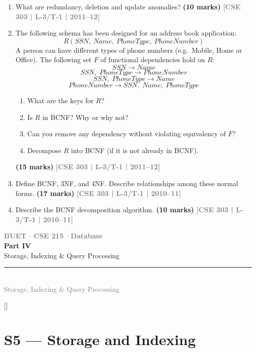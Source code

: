 \documentclass[12pt]{article}
\newcommand{\yr}[1]{\hfill\textcolor{gray}{\small\textbf{[#1]}}}
\newcommand{\mk}[1]{\textcolor{orange!70!black}{\small\textbf{(#1 marks)}}}
\newcommand{\secdivider}[4]{%
  \newpage\thispagestyle{empty}%
  \vspace*{\fill}%
  \begin{tcolorbox}[enhanced,colback=#4!7,colframe=#3,boxrule=1.5pt,arc=8pt,
    left=20pt,right=20pt,top=22pt,bottom=22pt,
    shadow={3pt}{-3pt}{0pt}{black!15}]
    \centering
    {\large\textcolor{gray}{\textbf{BUET $\cdot$ CSE 215 $\cdot$ Database}}}\\[8pt]
    {\fontsize{26}{32}\selectfont\bfseries\textcolor{#3}{#1}}\\[6pt]
    {\fontsize{15}{19}\selectfont\textcolor{dgray}{#2}}\\[12pt]
    \textcolor{#3!60}{\rule{0.5\textwidth}{0.5pt}}\\[6pt]
    {\small\textcolor{gray}{#2}}
  \end{tcolorbox}%
  \vspace*{\fill}\newpage%
}
\begin{document}
\begin{enumerate}
\item What are redundancy, deletion and update anomalies?
\mk{10} \yr{CSE 303 | L-3/T-1 | 2011--12}


\item The following schema has been designed for an address book application:
\[R(SSN,\ Name,\ PhoneType,\ PhoneNumber)\]
A person can have different types of phone numbers (e.g.\ Mobile, Home or Office). The following set $F$ of functional dependencies hold on $R$:
\[SSN \to Name\]
\[SSN,\;PhoneType \to PhoneNumber\]
\[SSN,\;PhoneType \to Name\]
\[PhoneNumber \to SSN,\;Name,\;PhoneType\]
\begin{enumerate}
  \item What are the keys for $R$?
  \item Is $R$ in BCNF? Why or why not?
  \item Can you remove any dependency without violating equivalency of $F$?
  \item Decompose $R$ into BCNF (if it is not already in BCNF).
\end{enumerate}
\mk{15} \yr{CSE 303 | L-3/T-1 | 2011--12}


\item Define BCNF, 3NF, and 4NF. Describe relationships among these normal forms.
\mk{17} \yr{CSE 303 | L-3/T-1 | 2010--11}


\item Describe the BCNF decomposition algorithm.
\mk{10} \yr{CSE 303 | L-3/T-1 | 2010--11}


\end{enumerate}



\secdivider{Part IV}{Storage, Indexing \& Query Processing}{cD}{cD}
\titleformat{\section}{\large\bfseries\color{cD}}{}{0em}{}[\titlerule]

\section{S5 --- Storage and Indexing}
\label{sec:S5}
\end{document}
